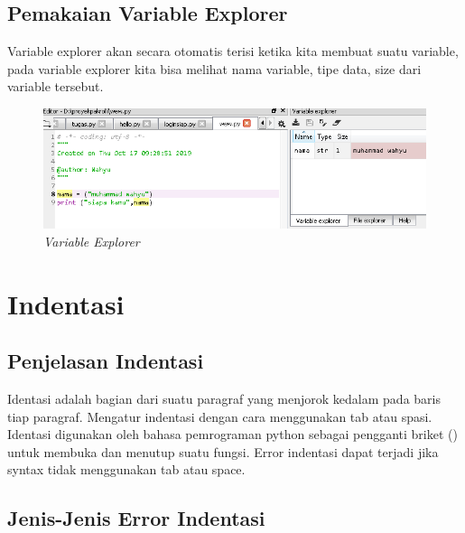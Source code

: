 \subsection{Pemakaian Variable Explorer}
Variable explorer akan secara otomatis terisi ketika kita membuat suatu variable, pada variable explorer kita bisa melihat nama variable, tipe data, size dari variable tersebut.
\begin{figure}[H]
    \centering
    \includegraphics[scale=0.4]{figures/b5}
    \caption{\textit{Variable Explorer}}
    \label{Variable Explorer}
\end{figure}

\section{Indentasi}
\subsection{Penjelasan Indentasi}
Identasi adalah bagian dari suatu paragraf yang menjorok kedalam pada baris tiap paragraf. Mengatur indentasi dengan cara menggunakan tab atau spasi. Identasi digunakan oleh bahasa pemrograman python sebagai pengganti briket ({}) untuk membuka dan menutup suatu fungsi. Error indentasi dapat terjadi jika syntax tidak menggunakan tab atau space.


\subsection{Jenis-Jenis Error Indentasi}

